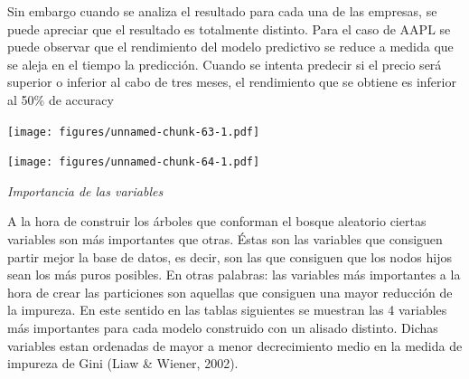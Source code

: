 \documentclass[]{DissertateUSU}
\begin{document}
\setlength\parskip{5ex}
\justifying

\noindent Sin embargo cuando se analiza el resultado para cada una de
las empresas, se puede apreciar que el resultado es totalmente distinto.
Para el caso de AAPL se puede observar que el rendimiento del modelo
predictivo se reduce a medida que se aleja en el tiempo la predicción.
Cuando se intenta predecir si el precio será superior o inferior al cabo
de tres meses, el rendimiento que se obtiene es inferior al 50\% de
accuracy

\texttt{[image: figures/unnamed-chunk-63-1.pdf]}

\setlength\parskip{5ex}
\justifying

\setlength\parskip{5ex}
\justifying

\texttt{[image: figures/unnamed-chunk-64-1.pdf]}

\setlength\parskip{5ex}
\justifying

\emph{Importancia de las variables}

\noindent A la hora de construir los árboles que conforman el bosque
aleatorio ciertas variables son más importantes que otras. Éstas son las
variables que consiguen partir mejor la base de datos, es decir, son las
que consiguen que los nodos hijos sean los más puros posibles. En otras
palabras: las variables más importantes a la hora de crear las
particiones son aquellas que consiguen una mayor reducción de la
impureza. En este sentido en las tablas siguientes se muestran las 4
variables más importantes para cada modelo construido con un alisado
distinto. Dichas variables estan ordenadas de mayor a menor
decrecimiento medio en la medida de impureza de Gini (Liaw \& Wiener,
2002).
\end{document}
